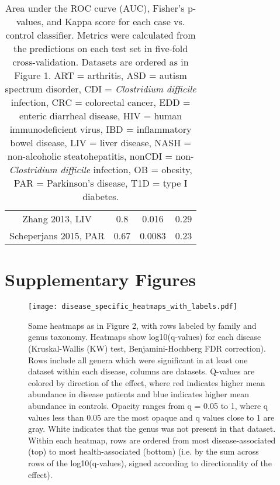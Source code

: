 {\begin{table}[h]
\begin{center}
{\begin{tabular}{ c  c  c  c}
	Zhang 2013, LIV & 0.8 & 0.016 & 0.29 \\
	Scheperjans 2015, PAR & 0.67 & 0.0083 & 0.23 \\
	\hline
\end{tabular}}
\caption{Area under the ROC curve (AUC), Fisher's p-values, and Kappa score for each case vs. control classifier. Metrics were calculated from the predictions on each test set in five-fold cross-validation. Datasets are ordered as in Figure 1. ART = arthritis, ASD = autism spectrum disorder, CDI = \textit{Clostridium difficile} infection, CRC = colorectal cancer, EDD = enteric diarrheal disease, HIV = human immunodeficient virus, IBD = inflammatory bowel disease, LIV = liver disease, NASH = non-alcoholic steatohepatitis, nonCDI = non-\textit{Clostridium difficile} infection, OB = obesity, PAR = Parkinson's disease, T1D = type I diabetes.}\label{tab:kappa}
\end{center}
\end{table}
}

\FloatBarrier
\clearpage
\section{Supplementary Figures}


\begin{figure}[h]
	\begin{centering}
	\texttt{[image: disease\_specific\_heatmaps\_with\_labels.pdf]}
	\caption{Same heatmaps as in Figure 2, with rows labeled by family and genus taxonomy. Heatmaps show log10(q-values) for each disease (Kruskal-Wallis (KW) test, Benjamini-Hochberg FDR correction). Rows include all genera which were significant in at least one dataset within each disease, columns are datasets. Q-values are colored by direction of the effect, where red indicates higher mean abundance in disease patients and blue indicates higher mean abundance in controls. Opacity ranges from q = 0.05 to 1, where q values less than 0.05 are the most opaque and q values close to 1 are gray. White indicates that the genus was not present in that dataset. Within each heatmap, rows are ordered from most disease-associated (top) to most health-associated (bottom) (i.e. by the sum across rows of the log10(q-values), signed according to directionality of the effect).
}
	\label{fig:supp_dis_specific}
	\end{centering}
\end{figure}


